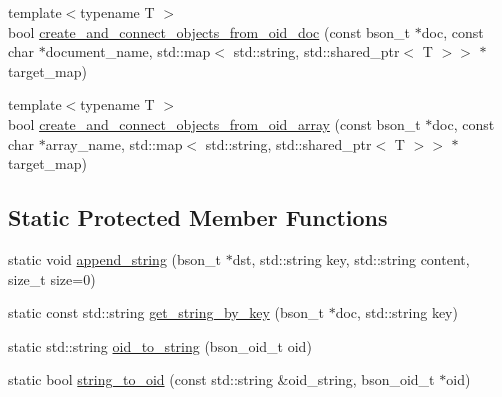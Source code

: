 \begin{DoxyCompactItemize}
\item 
{\footnotesize template$<$typename T $>$ }\\bool \hyperlink{class_mongo_object_ab879c65bc54d59dc56cc0ca652756e10}{create\+\_\+and\+\_\+connect\+\_\+objects\+\_\+from\+\_\+oid\+\_\+doc} (const bson\+\_\+t $\ast$doc, const char $\ast$document\+\_\+name, std\+::map$<$ std\+::string, std\+::shared\+\_\+ptr$<$ T $>$$>$ $\ast$target\+\_\+map)
\item 
{\footnotesize template$<$typename T $>$ }\\bool \hyperlink{class_mongo_object_a830f8d398209664c866f2c437667cc5a}{create\+\_\+and\+\_\+connect\+\_\+objects\+\_\+from\+\_\+oid\+\_\+array} (const bson\+\_\+t $\ast$doc, const char $\ast$array\+\_\+name, std\+::map$<$ std\+::string, std\+::shared\+\_\+ptr$<$ T $>$$>$ $\ast$target\+\_\+map)
\end{DoxyCompactItemize}
\subsection*{Static Protected Member Functions}
\begin{DoxyCompactItemize}
\item 
static void \hyperlink{class_mongo_object_ab659c54f28b5e13c6cb2fc0fc8ad4635}{append\+\_\+string} (bson\+\_\+t $\ast$dst, std\+::string key, std\+::string content, size\+\_\+t size=0)
\item 
static const std\+::string \hyperlink{class_mongo_object_a33799f83d7343fc5385869f5a907aeea}{get\+\_\+string\+\_\+by\+\_\+key} (bson\+\_\+t $\ast$doc, std\+::string key)
\item 
static std\+::string \hyperlink{class_mongo_object_a9592c8baaed700c358dc26025e3bf166}{oid\+\_\+to\+\_\+string} (bson\+\_\+oid\+\_\+t oid)
\item 
static bool \hyperlink{class_mongo_object_ae9bff3fe8b82864f36e6cb7aa8f159b0}{string\+\_\+to\+\_\+oid} (const std\+::string \&oid\+\_\+string, bson\+\_\+oid\+\_\+t $\ast$oid)
\end{DoxyCompactItemize}
